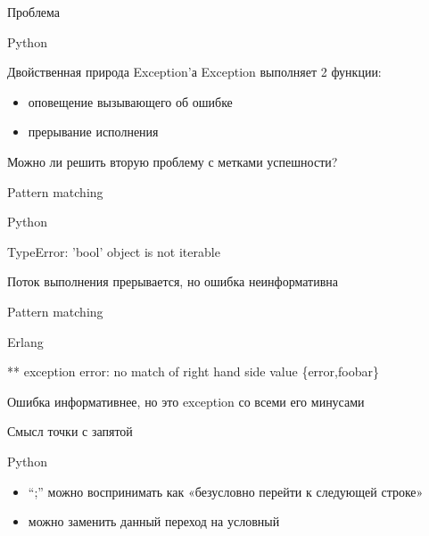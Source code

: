 \documentclass[10pt]{beamer}
\begin{document}
\begin{frame}{Проблема}
  \begin{block}{Python}
    \centering
    \small
    \lstset{language=python}
    
  \end{block}
\end{frame}

\begin{frame}{Двойственная природа Exception'а}
  Exception выполняет 2 функции:
  \begin{itemize}
  \item оповещение вызывающего об ошибке
  \item прерывание исполнения
  \end{itemize}
  Можно ли решить вторую проблему с метками успешности?
\end{frame}

\begin{frame}{Pattern matching}
  \begin{block}{Python}
    \centering
    \small
    \lstset{language=python}
    
  \end{block}
  \begin{block}{}
    TypeError: 'bool' object is not iterable
  \end{block}
  Поток выполнения прерывается, но ошибка неинформативна
\end{frame}

\begin{frame}{Pattern matching}
  \begin{block}{Erlang}
    \centering
    \small
    \lstset{language=erlang}
    
  \end{block}
  \begin{block}{}
    ** exception error: no match of right hand side value \{error,foobar\}
  \end{block}
  Ошибка информативнее, но это exception со всеми его минусами
\end{frame}

\begin{frame}{Смысл точки с запятой}
  \begin{block}{Python}
    \centering
    \small
    \lstset{language=python}
    
  \end{block}
  \begin{itemize}
  \item ``;'' можно воспринимать как «безусловно перейти к следующей строке»
  \item можно заменить данный переход на условный
  \end{itemize}
\end{frame}
\end{document}
